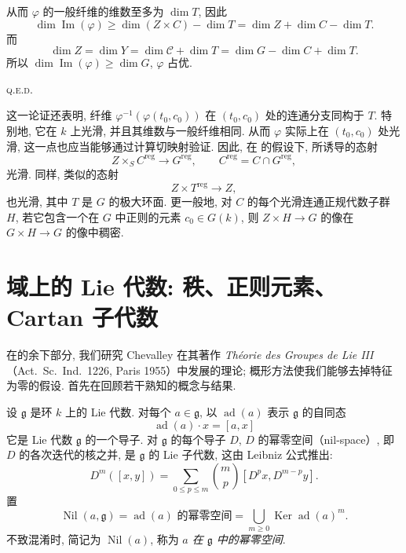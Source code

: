 从而 \(\varphi\) 的一般纤维的维数至多为 \(\dim T\), 因此
\[
  \dim\operatorname{Im}(\varphi)
  \geq
  \dim(Z\times C)-\dim T
  =
  \dim Z+\dim C-\dim T.
\]
而
\[
  \dim Z
  =
  \dim Y
  =
  \dim\mathcal C+\dim T
  =
  \dim G-\dim C+\dim T.
\]
所以 \(\dim\operatorname{Im}(\varphi)\geq\dim G\), \(\varphi\) 占优.
\par\hfill\textsc{q.e.d.}

\begin{remarks}
这一论证还表明, 纤维 \(\varphi^{-1}(\varphi(t_0,c_0))\) 在 \((t_0,c_0)\) 处的连通分支同构于 \(T\). 特别地, 它在 \(k\) 上光滑, 并且其维数与一般纤维相同. 从而 \(\varphi\) 实际上在 \((t_0,c_0)\) 处光滑, 这一点也应当能够通过计算切映射验证. 因此, 在  的假设下, 所诱导的态射
\[
  Z\times_S C^{\mathrm{reg}}\longrightarrow G^{\mathrm{reg}},
  \qquad C^{\mathrm{reg}}=C\cap G^{\mathrm{reg}},
\]
光滑. 同样, 类似的态射
\[
  Z\times T^{\mathrm{reg}}\longrightarrow Z,
\]
也光滑, 其中 \(T\) 是 \(G\) 的极大环面. 更一般地, 对 \(C\) 的每个光滑连通正规代数子群 \(H\), 若它包含一个在 \(G\) 中正则的元素 \(c_0\in G(k)\), 则 \(Z\times H\to G\) 的像在 \(G\times H\to G\) 的像中稠密.
\end{remarks}

\section{域上的 Lie 代数: 秩、正则元素、Cartan 子代数}

在的余下部分, 我们研究 Chevalley 在其著作 \emph{Théorie des Groupes de Lie III}（Act.\ Sc.\ Ind.\ 1226, Paris 1955）中发展的理论; 概形方法使我们能够去掉特征为零的假设. 首先在回顾若干熟知的概念与结果.

设 \(\mathfrak g\) 是环 \(k\) 上的 Lie 代数. 对每个 \(a\in\mathfrak g\), 以 \(\operatorname{ad}(a)\) 表示 \(\mathfrak g\) 的自同态
\[
  \operatorname{ad}(a)\cdot x=[a,x]
\]
它是 Lie 代数 \(\mathfrak g\) 的一个导子. 对 \(\mathfrak g\) 的每个导子 \(D\), \(D\) 的幂零空间（nil-space）, 即 \(D\) 的各次迭代的核之并, 是 \(\mathfrak g\) 的 Lie 子代数, 这由 Leibniz 公式推出:
\[
  D^m([x,y])
  =
  \sum_{0\leq p\leq m}
  \binom{m}{p}[D^p x,D^{m-p}y].
\]
置
\[
  \operatorname{Nil}(a,\mathfrak g)
  =
  \operatorname{ad}(a)\text{ 的幂零空间}
  =
  \bigcup_{m\geq0}\operatorname{Ker}\operatorname{ad}(a)^m.
\]
不致混淆时, 简记为 \(\operatorname{Nil}(a)\), 称为 \emph{\(a\) 在 \(\mathfrak g\) 中的幂零空间}.

